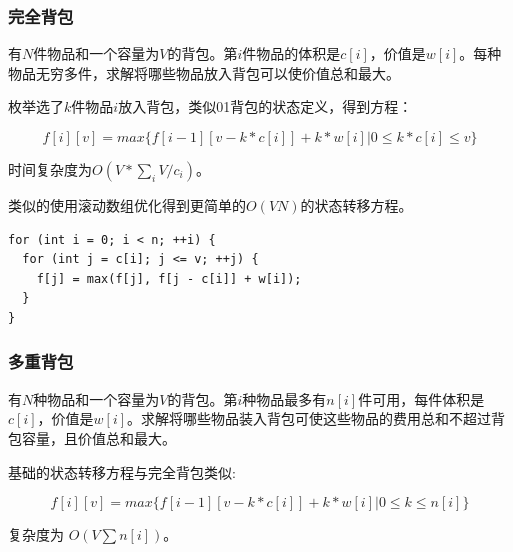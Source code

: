 \documentclass[11pt]{article}
\begin{document}
\subsubsection{完全背包}
\label{sec-5-2-2}

有\(N\)件物品和一个容量为\(V\)的背包。第\(i\)件物品的体积是\(c[i]\)，价值是\(w[i]\)。每种物品无穷多件，求解将哪些物品放入背包可以使价值总和最大。

枚举选了\(k\)件物品\(i\)放入背包，类似01背包的状态定义，得到方程：

$$
f[i][v]=max\{f[i-1][v-k*c[i]]+k*w[i]|0 \leq k*c[i] \leq v\}
$$

时间复杂度为\(O(V*\sum_i V/c_i)\)。

类似的使用滚动数组优化得到更简单的\(O(VN)\)的状态转移方程。

\begin{verbatim}
for (int i = 0; i < n; ++i) {
  for (int j = c[i]; j <= v; ++j) {
    f[j] = max(f[j], f[j - c[i]] + w[i]);
  }
}
\end{verbatim}

\subsubsection{多重背包}
\label{sec-5-2-3}

有\(N\)种物品和一个容量为\(V\)的背包。第\(i\)种物品最多有\(n[i]\)件可用，每件体积是\(c[i]\)，价值是\(w[i]\)。求解将哪些物品装入背包可使这些物品的费用总和不超过背包容量，且价值总和最大。

基础的状态转移方程与完全背包类似:

$$
f[i][v]=max\{f[i-1][v-k*c[i]]+k*w[i]|0 \leq k \leq n[i]\}
$$

复杂度为 \(O(V  \sum n[i])\)。
\end{document}
